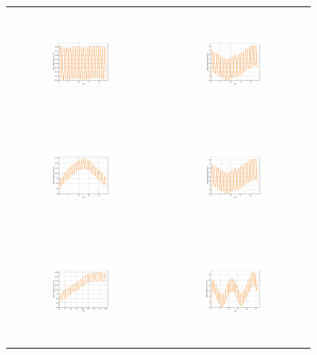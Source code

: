 \begin{figure}[H]
\begin{center}
\begin{tabular}{cc}
\includegraphics[width=0.45\textwidth, height=3.5cm]{graph/omega=2.00_A=1_plate.pdf}
&
\includegraphics[width=0.45\textwidth, height=3.5cm]{graph/omega=2.00_A=2_plate.pdf}\\
\includegraphics[width=0.45\textwidth, height=3.5cm]{graph/omega=2.00_A=3_plate.pdf}
&
\includegraphics[width=0.45\textwidth, height=3.5cm]{graph/omega=2.00_A=4_plate.pdf}\\
\includegraphics[width=0.45\textwidth, height=3.5cm]{graph/omega=2.00_A=5_plate.pdf}
&
\includegraphics[width=0.45\textwidth, height=3.5cm]{graph/omega=2.00_A=6_plate.pdf}\\

\end{tabular}
\end{center}
\end{figure}
